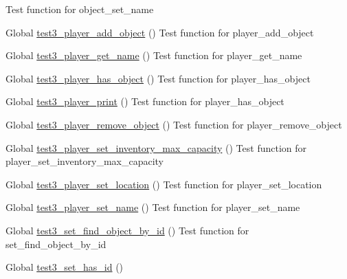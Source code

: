 \begin{DoxyRefList}
%
Test function for object\+\_\+set\+\_\+name  
\item[Global \mbox{\hyperlink{player__test_8c_ac984e5292c95002644a7af4fa499d0fb}{test3\+\_\+player\+\_\+add\+\_\+object}} ()]\label{test__test000140}%
%
Test function for player\+\_\+add\+\_\+object  
\item[Global \mbox{\hyperlink{player__test_8c_a47ca2429d85f332295322002954e1c89}{test3\+\_\+player\+\_\+get\+\_\+name}} ()]\label{test__test000133}%
%
Test function for player\+\_\+get\+\_\+name  
\item[Global \mbox{\hyperlink{player__test_8c_a956409720fca92e245d798491200f3d6}{test3\+\_\+player\+\_\+has\+\_\+object}} ()]\label{test__test000151}%
%
Test function for player\+\_\+has\+\_\+object  
\item[Global \mbox{\hyperlink{player__test_8c_a1d9fc6701483b45427b34a1d8e86e260}{test3\+\_\+player\+\_\+print}} ()]\label{test__test000159}%
%
Test function for player\+\_\+has\+\_\+object  
\item[Global \mbox{\hyperlink{player__test_8c_af84155cb375301e75475a91ef522e191}{test3\+\_\+player\+\_\+remove\+\_\+object}} ()]\label{test__test000143}%
%
Test function for player\+\_\+remove\+\_\+object  
\item[Global \mbox{\hyperlink{player__test_8c_ae3447f70a2f6ccb4f501f7630c667a73}{test3\+\_\+player\+\_\+set\+\_\+inventory\+\_\+max\+\_\+capacity}} ()]\label{test__test000156}%
%
Test function for player\+\_\+set\+\_\+inventory\+\_\+max\+\_\+capacity  
\item[Global \mbox{\hyperlink{player__test_8c_a317c0c84ef6ef843c15d5bab4a6b8a38}{test3\+\_\+player\+\_\+set\+\_\+location}} ()]\label{test__test000146}%
%
Test function for player\+\_\+set\+\_\+location  
\item[Global \mbox{\hyperlink{player__test_8c_a447ebbb4ba2206abeaf4b60200e312da}{test3\+\_\+player\+\_\+set\+\_\+name}} ()]\label{test__test000130}%
%
Test function for player\+\_\+set\+\_\+name  
\item[Global \mbox{\hyperlink{set__test_8c_adc3b0aec50481d5662dbfbcdf8f114c2}{test3\+\_\+set\+\_\+find\+\_\+object\+\_\+by\+\_\+id}} ()]\label{test__test000181}%
%
Test function for set\+\_\+find\+\_\+object\+\_\+by\+\_\+id  
\item[Global \mbox{\hyperlink{set__test_8c_a64322a83fd39da39e4570fbbc6976c3e}{test3\+\_\+set\+\_\+has\+\_\+id}} ()]\label{test__test000177}%

\end{DoxyRefList}
